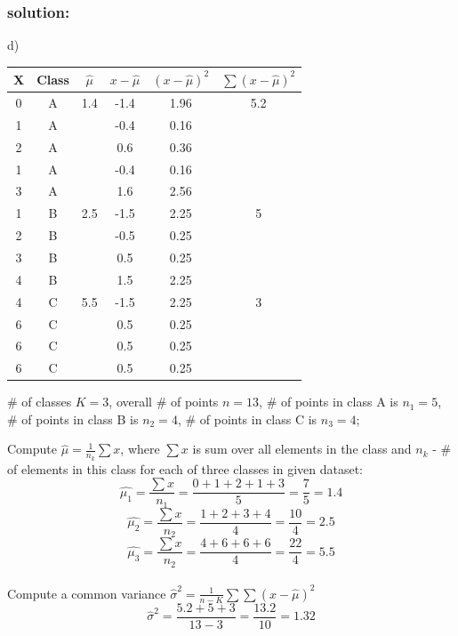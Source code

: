 \documentclass[a4paper,12pt,titlepage]{article} %
\begin{document}
\subsubsection{solution:}
d) 
\begin{center}
  \begin{tabular}{c|c||c|c|c|c}
    X & Class & $ \hat{\mu} $ & $ x - \hat{\mu} $ & $(x - \hat{\mu})^{2} $ & $ \sum{(x - \hat{\mu})^{2}} $\\
    \hline
    \hline
    0 & A & 1.4 & -1.4 & 1.96 & 5.2 \\
    1 & A &     & -0.4 & 0.16 &     \\
    2 & A &     &  0.6 & 0.36 &     \\
    1 & A &     & -0.4 & 0.16 &     \\
    3 & A &     &  1.6 & 2.56 &     \\
    \hline
    1 & B & 2.5 & -1.5 & 2.25 & 5 \\
    2 & B &     & -0.5 & 0.25 &   \\
    3 & B &     &  0.5 & 0.25 &   \\
    4 & B &     &  1.5 & 2.25 &   \\   
    \hline
    4 & C & 5.5 & -1.5 & 2.25 & 3 \\
    6 & C &     &  0.5 & 0.25 &  \\
    6 & C &     &  0.5 & 0.25 &  \\
    6 & C &     &  0.5 & 0.25 &  \\
    \hline
  \end{tabular}
\end{center}

\# of classes $ K= 3$, overall \# of points $ n = 13$, \# of points in class A is $ n_{1}= 5$, \# of points in class B is $ n_{2} = 4$, \# of points in class C is $ n_{3} = 4$;

Compute $ \hat{\mu} = \frac{1}{n_{k}} \sum{x} $, where $ \sum{x} $ is sum over all elements in the class and $ n_{k} $ - \# of elements in this class for each of three classes in given dataset:
$$ \hat{\mu_{1}} = \frac{\sum{x} }{n_{1} } = \frac{0+1+2+1+3}{5} = \frac{7}{5} = 1.4 $$
$$ \hat{\mu_{2}} = \frac{\sum{x} }{n_{2} } = \frac{1+2+3+4}{4} = \frac{10}{4} = 2.5 $$
$$ \hat{\mu_{3}} = \frac{\sum{x} }{n_{2} } = \frac{4+6+6+6}{4} = \frac{22}{4} = 5.5 $$\\

Compute a common variance $ \hat{\sigma}^{2} = \frac{1}{n-K} \sum \sum{(x - \hat{\mu})^{2}} $
$$ \hat{\sigma}^{2} = \frac {5.2+5+3}{13-3} = \frac{13.2}{10} = 1.32 $$
\end{document}
